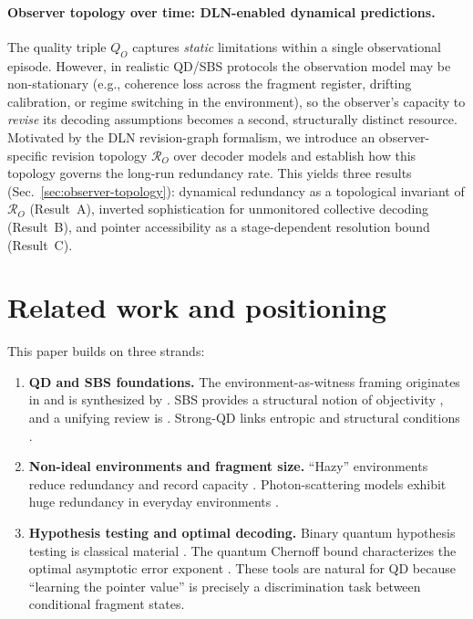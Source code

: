 \documentclass[11pt]{article}
\newcommand{\cR}{\mathcal{R}}
\newcommand{\1}{\mathbf{1}}
\theoremstyle{definition}
\theoremstyle{plain}
\begin{document}
\paragraph{Observer topology over time: DLN-enabled dynamical predictions.}
The quality triple $Q_O$ captures \emph{static} limitations within a single observational episode.  However, in realistic QD/SBS protocols the observation model may be non-stationary (e.g., coherence loss across the fragment register, drifting calibration, or regime switching in the environment), so the observer's capacity to \emph{revise} its decoding assumptions becomes a second, structurally distinct resource.  Motivated by the DLN revision-graph formalism, we introduce an observer-specific revision topology $\cR_O$ over decoder models and establish how this topology governs the long-run redundancy rate.  This yields three results (Sec.~\ref{sec:observer-topology}): dynamical redundancy as a topological invariant of $\cR_O$ (Result~A), inverted sophistication for unmonitored collective decoding (Result~B), and pointer accessibility as a stage-dependent resolution bound (Result~C).

\section{Related work and positioning}

This paper builds on three strands:

\begin{enumerate}[leftmargin=2em]
\item \textbf{QD and SBS foundations.}
The environment-as-witness framing originates in \citet{OPZ2004} and is synthesized by \citet{Zurek2009,BlumeKohoutZurek2006}.
SBS provides a structural notion of objectivity \citep{HorodeckiKorbiczHorodecki2015}, and a unifying review is \citet{KorbiczReview2021}.
Strong-QD links entropic and structural conditions \citep{LeOlayaCastro2019}.
\item \textbf{Non-ideal environments and fragment size.}
``Hazy'' environments reduce redundancy and record capacity \citep{ZwolakQuanZurek2009}.
Photon-scattering models exhibit huge redundancy in everyday environments \citep{RiedelZurek2010,RiedelZurek2011}.
\item \textbf{Hypothesis testing and optimal decoding.}
Binary quantum hypothesis testing is classical material \citep{Helstrom1976,Watrous2018}.
The quantum Chernoff bound characterizes the optimal asymptotic error exponent \citep{Audenaert2007,NussbaumSzkola2009}.
These tools are natural for QD because ``learning the pointer value'' is precisely a discrimination task between conditional fragment states.
\end{enumerate}
\end{document}
